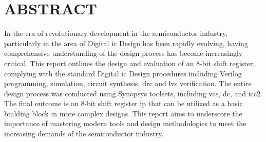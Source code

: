 \chapter*{ABSTRACT}
\label{Abstract-EN}

In the era of revolutionary development in the semiconductor industry, particularly in the area of Digital \acrfull{ic} Design has been rapidly evolving, having comprehensive understanding of the design process has become increasingly critical.
This report outlines the design and evaluation of an 8-bit shift register, complying with the standard Digital \acrshort{ic} Design procedures including Verilog programming, simulation, circuit synthesis, \acrfull{drc} and \acrfull{lvs} verification.
The entire design process was conducted using Synopsys toolsets, including \acrfull{vcs}, \acrfull{dc}, and \acrfull{icc2}. 
The final outcome is an 8-bit shift register \acrfull{ip} that can be utilized as a basic building block in more complex designs.
This report aims to underscore the importance of mastering modern tools and design methodologies to meet the increasing demands of the semiconductor industry.